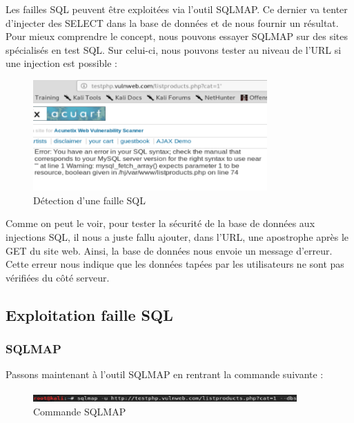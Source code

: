 Les failles SQL peuvent être exploitées via l’outil SQLMAP. Ce dernier va tenter d’injecter des SELECT dans la base de données et de nous fournir un résultat. Pour mieux comprendre le concept, nous pouvons essayer SQLMAP sur des sites spécialisés en test SQL. Sur celui-ci, nous pouvons tester au niveau de l’URL si une injection est possible :

\begin{figure}[htp!]
  \centering
  \setlength\figureheight{7cm}
  \setlength\figurewidth{9cm}
  \includegraphics[width=0.8\textwidth]{oui/Ancien/imangeancien/SQLi/1.PNG}
  \caption{Détection d'une faille SQL}
  \label{fig:courbe-tikz}
\end{figure}

Comme on peut le voir, pour tester la sécurité de la base de données aux injections SQL, il nous a juste fallu ajouter, dans l'URL, une apostrophe après le GET du site web. Ainsi, la base de données nous envoie un message d’erreur. Cette erreur nous indique que les données tapées par les utilisateurs ne sont pas vérifiées du côté serveur.

\subsection{Exploitation faille SQL}
\subsubsection{SQLMAP}

Passons maintenant à l’outil SQLMAP en rentrant la commande suivante :

\begin{figure}[htp!]
  \centering
  \setlength\figureheight{7cm}
  \setlength\figurewidth{9cm}
  \includegraphics[width=0.9\textwidth]{oui/Ancien/imangeancien/SQLi/2.PNG}
  \caption{Commande SQLMAP}
  \label{fig:courbe-tikz}
\end{figure}

